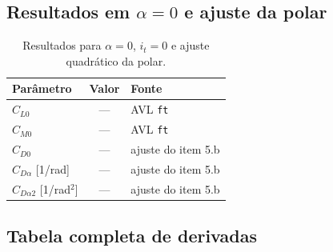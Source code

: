 \subsection*{Resultados em $\alpha = 0$ e ajuste da polar}


\begin{table}[H]
\centering
\caption{Resultados para $\alpha = 0$, $i_t = 0$ e ajuste quadrático da polar.}\label{tab:cl0_polar}
\renewcommand{\arraystretch}{1.25}
\begin{tabular}{lcl}
\toprule
Parâmetro & Valor & Fonte \\
\midrule
$C_{L0}$ & --- & AVL \texttt{ft} \\
$C_{M0}$ & --- & AVL \texttt{ft} \\
$C_{D0}$ & --- & ajuste do item 5.b \\
$C_{D\alpha}$ [1/rad] & --- & ajuste do item 5.b \\
$C_{D\alpha 2}$ [1/rad$^2$] & --- & ajuste do item 5.b \\
\bottomrule
\end{tabular}
\end{table}

\subsection*{Tabela completa de derivadas}

